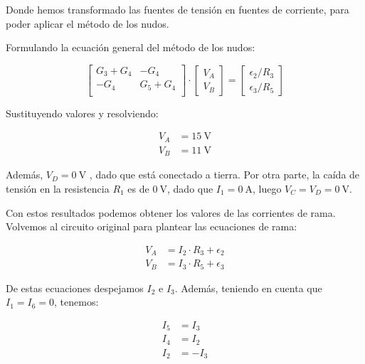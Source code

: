 \vspace{4mm}
Donde hemos transformado las fuentes de tensión en fuentes de corriente, para poder aplicar el método de los nudos.

\vspace{3mm}
Formulando la ecuación general del método de los nudos:

\begin{equation*}
  \begin{bmatrix}
    G_3 + G_4 & -G_4\\
    -G_4 & G_5 + G_4\\
  \end{bmatrix} \cdot %
  \begin{bmatrix}
    V_A\\
    V_B
  \end{bmatrix} = %
  \begin{bmatrix}
    \epsilon_2/R_3\\
    \epsilon_3/R_5
  \end{bmatrix}
\end{equation*}

\vspace{4mm}
Sustituyendo valores y resolviendo:

\begin{align*}
  V_A &= \qty{15}{\volt}\\
  V_B &= \qty{11}{\volt}
\end{align*}

Además, $V_D = \qty{0}{\volt}$ , dado que está conectado a tierra. Por otra parte, la caída de tensión en la resistencia $R_1$ es de $\qty{0}{\volt}$, dado que $I_1 = \qty{0}{\ampere}$, luego $V_C = V_D = \qty{0}{\volt}$.

\vspace{4mm}

Con estos resultados podemos obtener los valores de las corrientes de rama. Volvemos al circuito original para plantear las ecuaciones de rama:

\vspace{-4mm}
\begin{align*}
  V_A &= I_2 \cdot R_3 + \epsilon_2\\
  V_B &= I_3 \cdot R_5 + \epsilon_3
\end{align*}

De estas ecuaciones despejamos $I_2$ e $I_3$. Además, teniendo en cuenta que $I_1 = I_6 = 0$, tenemos:

\vspace{-3mm}
\begin{align*}
  I_5 &= I_3\\
  I_4 &= I_2\\
  I_2 &= -I_3
\end{align*}

